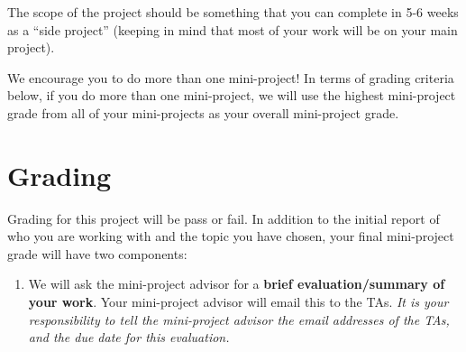 \documentclass[11pt]{article}
\begin{document}
The scope of the project should be something that you can complete in
5-6 weeks as a ``side project'' (keeping in mind that most of your work
will be on your main project).

We encourage you to do more than one mini-project!  In terms of grading
criteria below, if you do more than one mini-project, we will use the
highest mini-project grade from all of your mini-projects as your
overall mini-project grade.

\section{Grading}

Grading for this project will be pass or fail.  In addition to the initial
report of who you are working with and the topic you have chosen, your
final mini-project grade will have two components:

\begin{enumerate}
\itemsep=-1pt
\item We will ask the mini-project advisor for a {\bf brief
  evaluation/summary of your work}. Your mini-project advisor will email
  this to the TAs. {\em It is your responsibility to tell the
    mini-project advisor the email addresses of the TAs, and the due
    date for this evaluation.}
\end{enumerate}
\end{document}
